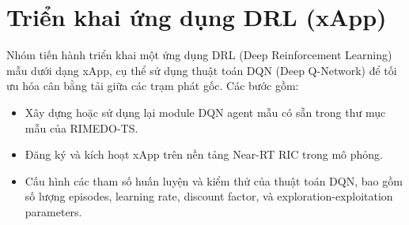 \section{Triển khai ứng dụng DRL (xApp)}

Nhóm tiến hành triển khai một ứng dụng DRL (Deep Reinforcement Learning) mẫu dưới dạng xApp, cụ thể sử dụng thuật toán DQN (Deep Q-Network) để tối ưu hóa cân bằng tải giữa các trạm phát gốc. Các bước gồm:

\begin{itemize}
    \item Xây dựng hoặc sử dụng lại module DQN agent mẫu có sẵn trong thư mục mẫu của RIMEDO-TS.
    \item Đăng ký và kích hoạt xApp trên nền tảng Near-RT RIC trong mô phỏng.
    \item Cấu hình các tham số huấn luyện và kiểm thử của thuật toán DQN, bao gồm số lượng episodes, learning rate, discount factor, và exploration-exploitation parameters.
\end{itemize}